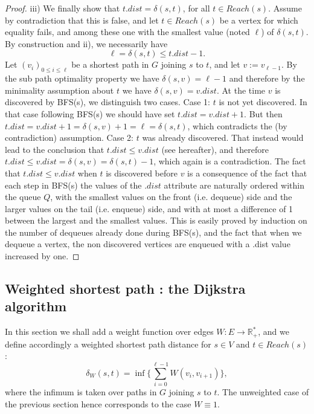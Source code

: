 \documentclass[12pt]{article}
\theoremstyle{plain}
\theoremstyle{remark}
\newcommand{\R}{\mathbb{R}}
\begin{document}
\begin{proof}
	iii) We finally show that $t.dist = \delta(s,t)$, for all $t \in Reach(s).$
	Assume by contradiction that this is false, and let $t \in Reach(s)$ be
	a vertex for which equality fails, and among these one with the smallest
	value (noted $\ell$) of $\delta(s,t).$ By construction and ii), we necessarily  have
	$$
	\ell = \delta(s,t) \leq t.dist - 1.
	$$
	Let $(v_i)_{0 \leq i \leq \ell}$ be a shortest path in $G$ joining $s$
	to $t$, and let $v := v_{\ell - 1}.$ By the sub path optimality property 
	we have $\delta(s,v) = \ell - 1$ and therefore by the minimality
	assumption about $t$ we have $\delta(s,v) = v.dist.$  At the time $v$ is
	discovered by BFS(s), we distinguish two cases. Case 1: $t$ is not yet
	discovered. In that case following BFS(s) we should have set $t.dist =
	v.dist + 1.$ But then $t.dist = v.dist + 1 = \delta(s,v) + 1 = \ell =
	\delta(s,t)$, which contradicts the (by contradiction) assumption. Case
	2: $t$ was already discovered. That instead would lead to the conclusion
	that $t.dist \leq v.dist$ (see hereafter), and therefore $t.dist \leq v.dist =
	\delta(s,v) = \delta(s,t) - 1$, which again is a contradiction. The fact
	that $t.dist \leq v.dist$ when $t$ is discovered before $v$ is a consequence 
	of the fact that each step in BFS(s) the values of the $.dist$
	attribute are naturally ordered within the queue $Q$, with the
	smallest values on the front (i.e. dequeue) side and the larger values on
	the tail (i.e. enqueue) side, and with at most a difference of 1 between the
	largest and the smallest values. This is easily proved by induction on
	the number of dequeues already done during BFS(s), and the fact that
	when we dequeue a vertex, the non discovered vertices are enqueued with
	a .dist value increased by one.
\end{proof}

\subsection{Weighted shortest path : the Dijkstra algorithm}

In this section we shall add a weight function over edges $W : E \to \R_+^*$,
and we define accordingly a weighted shortest path distance for $s \in V$ and $t
\in Reach(s)$ : 
$$
\delta_W(s,t) = \inf\Big\{ \sum_{i=0}^{\ell - 1}W(v_i, v_{i+1})\Big\}, 
$$
where the infimum is taken over paths in $G$ joining $s$ to $t.$ The unweighted
case of the previous section hence corresponds to the case $W \equiv 1.$
\end{document}

